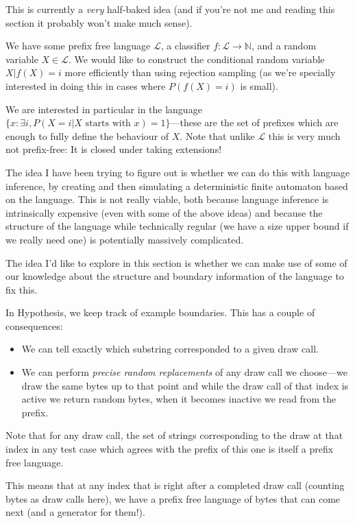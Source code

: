\documentclass[a4paper]{book}
\begin{document}
This is currently a \emph{very} half-baked idea (and if you're not me and reading this section it probably won't make much sense).

We have some prefix free language \(\mathcal{L}\), a classifier \(f: \mathcal{L} \to \mathbb{N}\),
and a random variable \(X \in \mathcal{L}\).
We would like to construct the conditional random variable \(X|f(X) = i\) more efficiently than using rejection sampling
(as we're specially interested in doing this in cases where \(P(f(X) = i)\) is small).

We are interested in particular in the language \(\{x: \exists i, P(X = i|X \text{ starts with } x) = 1\}\)---these
are the set of prefixes which are enough to fully define the behaviour of \(X\).
Note that unlike \(\mathcal{L}\) this is very much not prefix-free:
It is closed under taking extensions!

The idea I have been trying to figure out is whether we can do this with language inference,
by creating and then simulating a deterministic finite automaton based on the language.
This is not really viable,
both because language inference is intrinsically expensive (even with some of the above ideas) and because the structure of the language while technically regular (we have a size upper bound if we really need one) is potentially massively complicated.

The idea I'd like to explore in this section is whether we can make use of some of our knowledge about the structure and boundary information of the language to fix this.

In Hypothesis,
we keep track of example boundaries.
This has a couple of consequences:

\begin{itemize}
\item We can tell exactly which substring corresponded to a given draw call.
\item We can perform \emph{precise random replacements} of any draw call we choose---we
draw the same bytes up to that point and while the draw call of that index is active we return random bytes,
when it becomes inactive we read from the prefix.
\end{itemize}

Note that for any draw call,
the set of strings corresponding to the draw at that index in any test case which agrees with the prefix of this one is itself a prefix free language.

This means that at any index that is right after a completed draw call (counting bytes as draw calls here),
we have a prefix free language of bytes that can come next (and a generator for them!).
\end{document}
